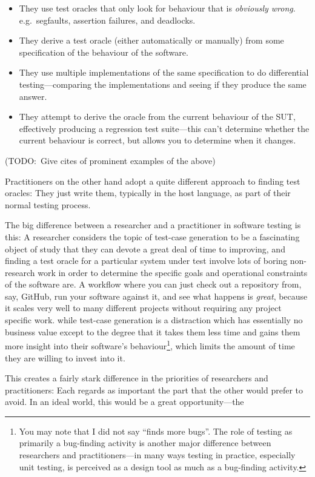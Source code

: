 \begin{itemize}
\item They use test oracles that only look for behaviour that is \emph{obviously wrong}.
e.g.\ segfaults, assertion failures, and deadlocks.
\item They derive a test oracle (either automatically or manually) from some specification of the behaviour of the software.
\item They use multiple implementations of the same specification to do differential testing---comparing
the implementations and seeing if they produce the same answer.
\item They attempt to derive the oracle from the current behaviour of the SUT,
effectively producing a regression test suite---this
can't determine whether the current behaviour is correct,
but allows you to determine when it changes.
\end{itemize}

(TODO:\ Give cites of prominent examples of the above)

Practitioners on the other hand adopt a quite different approach to finding test oracles:
They just write them,
typically in the host language,
as part of their normal testing process.

The big difference between a researcher and a practitioner in software testing is this:
A researcher considers the topic of test-case generation to be a fascinating object of study that they can devote a great deal of time to improving,
and finding a test oracle for a particular system under test involve lots of boring non-research work in order to determine the specific goals and operational constraints of the software are.
A workflow where you can just check out a repository from, say, GitHub, run your software against it, and see what happens is \emph{great},
because it scales very well to many different projects without requiring any project specific work.
while test-case generation is a distraction which has essentially no business value except to the degree that it takes them less time and gains them more insight into their software's behaviour\footnote{
You may note that I did not say ``finds more bugs''.
The role of testing as primarily a bug-finding activity is another major difference between researchers and practitioners---in
many ways testing in practice,
especially unit testing,
is perceived as a design tool as much as a bug-finding activity.
},
which limits the amount of time they are willing to invest into it.

This creates a fairly stark difference in the priorities of researchers and practitioners:
Each regards as important the part that the other would prefer to avoid.
In an ideal world,
this would be a great opportunity---the

